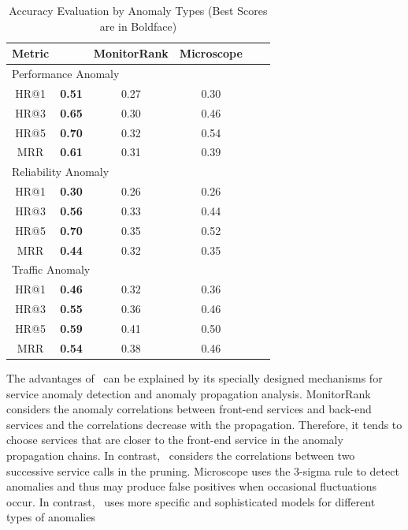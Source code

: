 \begin{table}[h]
	\newcommand{\tabincell}[2]{\begin{tabular}{@{}#1@{}}#2\end{tabular}}
	\caption{Accuracy Evaluation by Anomaly Types (Best Scores are in Boldface)}
	\label{tab:performance_algorithm_compare}
	\small
	\centering
		\begin{tabular}{|c|c|c|c|c|c|}
			\hline \textbf{Metric} & \textbf{\app~} & \textbf{MonitorRank} & \textbf{Microscope}\\
			\hline   \multicolumn{4}{|l|}{\cellcolor{gray!40} Performance Anomaly}  \\
			\hline HR@1    & \textbf{0.51} & 0.27  & 0.30   \\
			\hline HR@3    & \textbf{0.65} & 0.30  & 0.46   \\
			\hline HR@5    & \textbf{0.70} & 0.32  & 0.54   \\
			\hline MRR  & \textbf{0.61} & 0.31  & 0.39   \\
	   \hline   \multicolumn{4}{|l|}{\cellcolor{gray!40} Reliability Anomaly}  \\
			\hline HR@1    & \textbf{0.30 }& 0.26  & 0.26  \\
			\hline HR@3    & \textbf{0.56} & 0.33  & 0.44   \\
			\hline HR@5    & \textbf{0.70} & 0.35  & 0.52  \\
			\hline MRR  & \textbf{0.44} & 0.32  & 0.35  \\
			\hline   \multicolumn{4}{|l|}{\cellcolor{gray!40} Traffic Anomaly} \\
			\hline HR@1    & \textbf{0.46} & 0.32  & 0.36 \\
			\hline HR@3    & \textbf{0.55}  & 0.36  & 0.46  \\
			\hline HR@5    & \textbf{0.59} & 0.41  & 0.50  \\
			\hline MRR  & \textbf{0.54}  & 0.38  & 0.46 \\
			\hline
		\end{tabular}
	\vspace{-3pt}
\end{table}

The advantages of \app~can be explained by its specially designed mechanisms for service anomaly detection and anomaly propagation analysis.
MonitorRank considers the anomaly correlations between front-end services and back-end services and the correlations decrease with the propagation.
Therefore, it tends to choose services that are closer to the front-end service in the anomaly propagation chains.
In contrast, \app~considers the correlations between two successive service calls in the pruning.
Microscope uses the 3-sigma rule to detect anomalies and thus may produce false positives when occasional fluctuations occur.
In contrast, \app~uses more specific and sophisticated models for different types of anomalies

